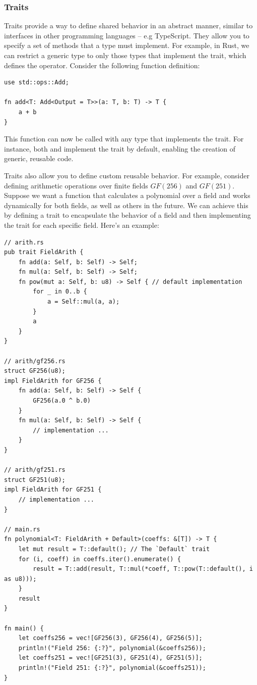 \documentclass[11pt]{report}
\theoremstyle{definition}
\theoremstyle{plain}
\begin{document}
\subsubsection{Traits}
Traits provide a way to define shared behavior in an abstract manner, similar to interfaces in other programming languages -- e.g TypeScript. They allow you to specify a set of methods that a type must implement. For example, in Rust, we can restrict a generic type  to only those types that implement the  trait, which defines the \rust{+} operator. Consider the following function definition:

\begin{verbatim}
use std::ops::Add;

fn add<T: Add<Output = T>>(a: T, b: T) -> T {
    a + b
}
\end{verbatim}

This function can now be called with any type that implements the  trait. For instance, both  and  implement the  trait by default, enabling the creation of generic, reusable code.

Traits also allow you to define custom reusable behavior. For example, consider defining arithmetic operations over finite fields $GF(256)$ and $GF(251)$. Suppose we want a function that calculates a polynomial over a field and works dynamically for both fields, as well as others in the future. We can achieve this by defining a trait to encapsulate the behavior of a field and then implementing the trait for each specific field. Here's an example:

\begin{verbatim}
// arith.rs
pub trait FieldArith {
    fn add(a: Self, b: Self) -> Self;
    fn mul(a: Self, b: Self) -> Self;
    fn pow(mut a: Self, b: u8) -> Self { // default implementation
        for _ in 0..b {
            a = Self::mul(a, a);
        }
        a
    }
}

// arith/gf256.rs
struct GF256(u8);
impl FieldArith for GF256 {
    fn add(a: Self, b: Self) -> Self {
        GF256(a.0 ^ b.0)
    }
    fn mul(a: Self, b: Self) -> Self {
        // implementation ...
    }
}

// arith/gf251.rs
struct GF251(u8);
impl FieldArith for GF251 {
    // implementation ...
}

// main.rs
fn polynomial<T: FieldArith + Default>(coeffs: &[T]) -> T {
    let mut result = T::default(); // The `Default` trait
    for (i, coeff) in coeffs.iter().enumerate() {
        result = T::add(result, T::mul(*coeff, T::pow(T::default(), i as u8)));
    }
    result
}

fn main() {
    let coeffs256 = vec![GF256(3), GF256(4), GF256(5)];
    println!("Field 256: {:?}", polynomial(&coeffs256));
    let coeffs251 = vec![GF251(3), GF251(4), GF251(5)];
    println!("Field 251: {:?}", polynomial(&coeffs251));
}
\end{verbatim}
\end{document}
